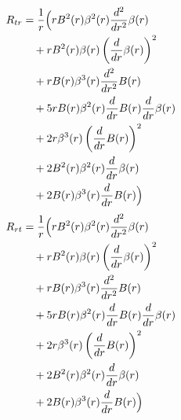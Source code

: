 \documentclass[11pt,a4paper]{article}
\begin{document}
\begin{align*}
  R_{tr} &= \frac{1}{r}\Bigl(r B^{2}{\left(r \right)} \beta^{2}{\left(r \right)} \frac{d^{2}}{d r^{2}} \beta{\left(r \right)} \\
  &\quad + r B^{2}{\left(r \right)} \beta{\left(r \right)} \left(\frac{d}{d r} \beta{\left(r \right)}\right)^{2} \\
  &\quad + r B{\left(r \right)} \beta^{3}{\left(r \right)} \frac{d^{2}}{d r^{2}} B{\left(r \right)} \\
  &\quad + 5 r B{\left(r \right)} \beta^{2}{\left(r \right)} \frac{d}{d r} B{\left(r \right)} \frac{d}{d r} \beta{\left(r \right)} \\
  &\quad + 2 r \beta^{3}{\left(r \right)} \left(\frac{d}{d r} B{\left(r \right)}\right)^{2} \\
  &\quad + 2 B^{2}{\left(r \right)} \beta^{2}{\left(r \right)} \frac{d}{d r} \beta{\left(r \right)} \\
  &\quad + 2 B{\left(r \right)} \beta^{3}{\left(r \right)} \frac{d}{d r} B{\left(r \right)}\Bigr)
\end{align*}
\begin{align*}
  R_{rt} &= \frac{1}{r}\Bigl(r B^{2}{\left(r \right)} \beta^{2}{\left(r \right)} \frac{d^{2}}{d r^{2}} \beta{\left(r \right)} \\
  &\quad + r B^{2}{\left(r \right)} \beta{\left(r \right)} \left(\frac{d}{d r} \beta{\left(r \right)}\right)^{2} \\
  &\quad + r B{\left(r \right)} \beta^{3}{\left(r \right)} \frac{d^{2}}{d r^{2}} B{\left(r \right)} \\
  &\quad + 5 r B{\left(r \right)} \beta^{2}{\left(r \right)} \frac{d}{d r} B{\left(r \right)} \frac{d}{d r} \beta{\left(r \right)} \\
  &\quad + 2 r \beta^{3}{\left(r \right)} \left(\frac{d}{d r} B{\left(r \right)}\right)^{2} \\
  &\quad + 2 B^{2}{\left(r \right)} \beta^{2}{\left(r \right)} \frac{d}{d r} \beta{\left(r \right)} \\
  &\quad + 2 B{\left(r \right)} \beta^{3}{\left(r \right)} \frac{d}{d r} B{\left(r \right)}\Bigr)
\end{align*}
\end{document}
